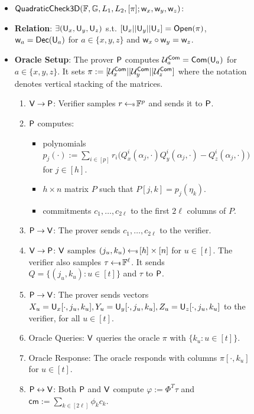 \begin{figure}[h!]
\centering
\begin{framed}
\begin{itemize}
\item $\mathsf{QuadraticCheck3D}(\mathbb{F},\mathbb{G},L_1,L_2,[\pi];\mathsf{w}_x,\mathsf{w}_y,\mathsf{w}_z)$:
\item {\bf Relation}: $\exists (\mathsf{U}_x,\mathsf{U}_y,\mathsf{U}_z)$
s.t. $[\mathsf{U}_x||\mathsf{U}_y||\mathsf{U}_z]=\mathsf{Open}(\pi)$, $\mathsf{w}_{a}=\mathsf{Dec}(\mathsf{U}_a)$ for $a\in
\{x,y,z\}$ and $\mathsf{w}_x\circ \mathsf{w}_y = \mathsf{w}_z$.
\item {\bf Oracle Setup}: The prover $\mathsf{P}$ computes $\mathcal{U}^{\mathsf{Com}}_a=\mathsf{Com}(\mathsf{U}_a)$ 
for $a\in \{x,y,z\}$. It sets $\pi :=
[\mathcal{U}^{\mathsf{Com}}_x||\mathcal{U}^{\mathsf{Com}}_y||\mathcal{U}^{\mathsf{Com}}_z]$ where the notation denotes vertical
stacking of the matrices. 
\begin{enumerate}[{\rm 1.}]
\item $\mathsf{V}\rightarrow\mathsf{P}$: Verifier samples $r\hskip2.3pt{\gets\!\!\mbox{\tiny${\$}$\normalsize}}\,\mathbb{F}^p$ and sends
it to $\mathsf{P}$.
\item $\mathsf{P}$ computes:
	\begin{itemize}
	\item polynomials $p_j(\cdot):=\sum_{i\in
[p]}r_i\big(Q^i_x(\alpha_j,\cdot)Q^i_y(\alpha_j,\cdot)-Q^i_z(\alpha_j,\cdot)\big)$
for $j\in [h]$.
	\item $h\times n$ matrix $P$ such that $P[j,k]=p_j(\eta_k)$.
	\item commitments $c_1,\ldots,c_{2\ell}$ to the first $2\ell$ columns of
$P$.
	\end{itemize}
\item $\mathsf{P}\rightarrow\mathsf{V}$: The prover sends $c_1,\ldots,c_{2\ell}$ to
the verifier.
\item $\mathsf{V}\rightarrow\mathsf{P}$: $\mathsf{V}$ samples $(j_u,k_u)\hskip2.3pt{\gets\!\!\mbox{\tiny${\$}$\normalsize}}\,
[h]\times [n]$ for $u\in [t]$. The verifier also samples $\tau\hskip2.3pt{\gets\!\!\mbox{\tiny${\$}$\normalsize}}\,
\mathbb{F}^{\ell}$. It sends $Q=\{(j_u,k_u):u\in [t]\}$ and $\tau$ to $\mathsf{P}$.
\item $\mathsf{P}\rightarrow\mathsf{V}$: The prover sends vectors
$X_u=\mathsf{U}_x[\cdot,j_u,k_u],Y_u=\mathsf{U}_y[\cdot,j_u,k_u],Z_u=\mathsf{U}_z[\cdot,j_u,k_u]$
to the verifier, for all $u\in [t]$.
\item Oracle Queries: $\mathsf{V}$ queries the oracle $\pi$ with $\{k_u: u\in
[t]\}$.
\item Oracle Response: The oracle responds with columns $\pi[\cdot,k_u]$ for
$u\in [t]$.
\item $\mathsf{P}\leftrightarrow\mathsf{V}$: Both $\mathsf{P}$ and $\mathsf{V}$ compute
$\varphi := \Phi^T\tau$ and $\mathsf{cm}:= \sum_{k\in [2\ell]}\phi_kc_k$.

\end{enumerate}
\end{itemize}
\end{framed}
\end{figure}
